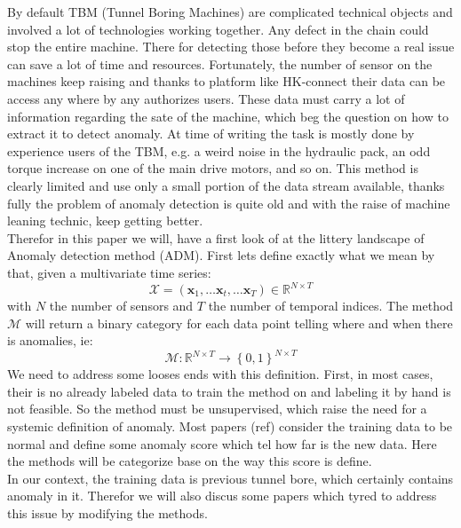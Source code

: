 \documentclass[../../main/main.tex]{subfiles}
\begin{document}

    By default TBM (Tunnel Boring Machines) are complicated technical objects and involved 
    a lot of technologies working together. Any defect in the chain could stop the entire machine. There for detecting those 
    before they become a real issue can save a lot of time and resources. Fortunately, the number of sensor on the machines keep raising 
    and thanks to platform like HK-connect their data can be access any where by any authorizes users. These data must carry a lot of information 
    regarding the sate of the machine, which beg the question on how to extract it to detect anomaly. At time of writing the task is mostly done
    by experience users of the TBM, e.g. a weird noise in the hydraulic pack, an odd torque increase on one of the
    main drive motors, and so on. This method is clearly limited and use only a small portion of the data stream available, thanks fully the 
    problem of anomaly detection is quite old and with the raise of machine leaning technic, keep getting better. \\
    Therefor in this paper we will, have a first look of at the littery landscape of Anomaly detection method (ADM).
    First lets define exactly what we mean by that, given a multivariate time series: 
    \[\mathcal{X} = (\textbf{x}_1, \dots \textbf{x}_t, \dots \textbf{x}_T) \in \mathbb{R}^{N \times T}\]
    with $N$ the number of sensors and $T$ the number of temporal indices. The method $\mathcal{M} $ will return a binary category for each data point 
    telling where and when there is anomalies, ie:
    \[\mathcal{M} : \mathbb{R}^{N \times T} \to \left\{0, 1\right\} ^{N \times T}\]
    We need to address some looses ends with this definition. First, in most cases, their is no already labeled data to train the method on
    and labeling it by hand is not feasible. So the method must be unsupervised, which raise the need for a systemic definition of anomaly. 
    Most papers (ref) consider the training data to be normal and define some anomaly score which tel how far is the new data. Here the methods will 
    be categorize base on the way this score is define.\\
    In our context, the training data is previous tunnel bore, which certainly contains anomaly in it. Therefor we will also discus some 
    papers which tyred to address this issue by modifying the methods. 
\end{document}
